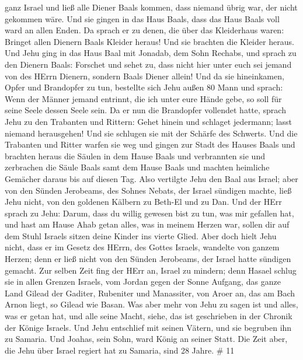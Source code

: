 ganz Israel und ließ alle Diener Baals kommen, dass niemand übrig war,
der nicht gekommen wäre. Und sie gingen in das Haus Baals, dass das Haus
Baals voll ward an allen Enden.  Da sprach er zu denen, die
über das Kleiderhaus waren: Bringet allen Dienern Baals Kleider heraus!
Und sie brachten die Kleider heraus.  Und Jehu ging in das
Haus Baal mit Jonadab, dem Sohn Rechabs, und sprach zu den Dienern
Baals: Forschet und sehet zu, dass nicht hier unter euch sei jemand von
des HErrn Dienern, sondern Baals Diener allein!  Und da sie
hineinkamen, Opfer und Brandopfer zu tun, bestellte sich Jehu außen 80
Mann und sprach: Wenn der Männer jemand entrinnt, die ich unter eure
Hände gebe, so soll für seine Seele dessen Seele sein.  Da
er nun die Brandopfer vollendet hatte, sprach Jehu zu den Trabanten und
Rittern: Gehet hinein und schlaget jedermann; lasst niemand herausgehen!
Und sie schlugen sie mit der Schärfe des Schwerts. Und die Trabanten und
Ritter warfen sie weg und gingen zur Stadt des Hauses Baals
 und brachten heraus die Säulen in dem Hause Baals und
verbrannten sie  und zerbrachen die Säule Baals samt dem
Hause Baals und machten heimliche Gemächer daraus bis auf diesen Tag.
 Also vertilgte Jehu den Baal aus Israel; 
aber von den Sünden Jerobeams, des Sohnes Nebats, der Israel sündigen
machte, ließ Jehu nicht, von den goldenen Kälbern zu Beth-El und zu Dan.
 Und der HErr sprach zu Jehu: Darum, dass du willig gewesen
bist zu tun, was mir gefallen hat, und hast am Hause Ahab getan alles,
was in meinem Herzen war, sollen dir auf dem Stuhl Israels sitzen deine
Kinder ins vierte Glied.  Aber doch hielt Jehu nicht, dass
er im Gesetz des HErrn, des Gottes Israels, wandelte von ganzem Herzen;
denn er ließ nicht von den Sünden Jerobeams, der Israel hatte sündigen
gemacht.  Zur selben Zeit fing der HErr an, Israel zu
mindern; denn Hasael schlug sie in allen Grenzen Israels, 
vom Jordan gegen der Sonne Aufgang, das ganze Land Gilead der Gaditer,
Rubeniter und Manassiter, von Aroer an, das am Bach Arnon liegt, so
Gilead wie Basan.  Was aber mehr von Jehu zu sagen ist und
alles, was er getan hat, und alle seine Macht, siehe, das ist
geschrieben in der Chronik der Könige Israels.  Und Jehu
entschlief mit seinen Vätern, und sie begruben ihn zu Samaria. Und
Joahas, sein Sohn, ward König an seiner Statt.  Die Zeit
aber, die Jehu über Israel regiert hat zu Samaria, sind 28 Jahre. \# 11
